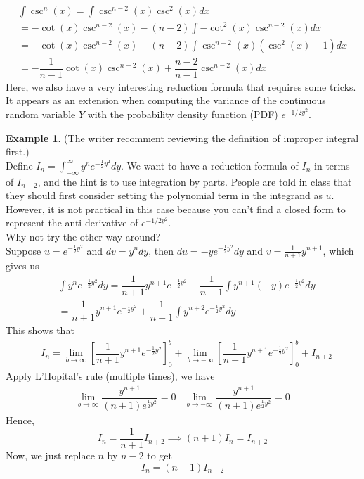 \documentclass{article}
\theoremstyle{definition}
\theoremstyle{definition}
\theoremstyle{definition}
\theoremstyle{definition}
\theoremstyle{definition}
\theoremstyle{definition}
\newtheorem{example}{Example}
\theoremstyle{definition}
\theoremstyle{definition}
\theoremstyle{definition}
\begin{document}
\begin{align*}
    \int\csc^n(x)=\int\csc^{n-2}(x)\csc^2(x)dx\\
    =-\cot(x)\csc^{n-2}(x)-(n-2)\int -\cot^2(x)\csc^{n-2}(x)dx\\
    =-\cot(x)\csc^{n-2}(x)-(n-2)\int\csc^{n-2}(x)(\csc^2(x)-1)dx\\
    =-\dfrac{1}{n-1}\cot(x)\csc^{n-2}(x)+\dfrac{n-2}{n-1}\csc^{n-2}(x)dx
\end{align*}
Here, we also have a very interesting reduction formula that requires some tricks.
It appears as an extension when computing the variance of the continuous random variable $Y$ with the probability density function (PDF) $e^{-1/2y^2}$.\\
\begin{example}
    (The writer recomment reviewing the definition of improper integral first.)\\
    Define $I_n=\int_{-\infty}^\infty y^ne^{-\frac{1}{2}y^2}dy$. We want to have a reduction formula of $I_n$ in terms of $I_{n-2}$, and the hint is to use integration by parts.
    People are told in class that they should first consider setting the polynomial term in the integrand as $u$. However, it is not practical in this case because you can't find a closed form to represent the anti-derivative of $e^{-1/2y^2}$.\\
    Why not try the other way around?\\
    Suppose $u=e^{-\frac{1}{2}y^2}$ and $dv=y^ndy$, then $du=-ye^{-\frac{1}{2}y^2}dy$ and $v=\frac{1}{n+1}y^{n+1}$, which gives us
    \begin{align*}
        &\int y^ne^{-\frac{1}{2}y^2}dy=\dfrac{1}{n+1}y^{n+1}e^{-\frac{1}{2}y^2}-\dfrac{1}{n+1}\int y^{n+1}(-y)e^{-\frac{1}{2}y^2}dy\\
        &=\dfrac{1}{n+1}y^{n+1}e^{-\frac{1}{2}y^2}+\dfrac{1}{n+1}\int y^{n+2}e^{-\frac{1}{2}y^2}dy
    \end{align*}
    This shows that
    \begin{align*}
        &I_n=\lim_{b\to\infty}\left[\dfrac{1}{n+1}y^{n+1}e^{-\frac{1}{2}y^2}\right]_0^b+\lim_{b\to-\infty}\left[\dfrac{1}{n+1}y^{n+1}e^{-\frac{1}{2}y^2}\right]_0^b+I_{n+2}
    \end{align*}
    Apply L'Hopital's rule (multiple times), we have
    \begin{align*}
        \lim_{b\to\infty}\dfrac{y^{n+1}}{(n+1)e^{\frac{1}{2}y^2}}=0 & \lim_{b\to -\infty}\dfrac{y^{n+1}}{(n+1)e^{\frac{1}{2}y^2}}=0
    \end{align*}
    Hence, 
    \[
        I_n=\dfrac{1}{n+1}I_{n+2} \implies (n+1)I_n=I_{n+2}  
    \]
    Now, we just replace $n$ by $n-2$ to get
    \[I_n=(n-1)I_{n-2}\]
\end{example}
\end{document}
